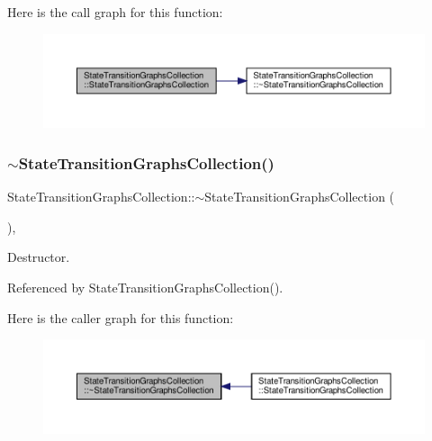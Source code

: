 Here is the call graph for this function\+:
\nopagebreak
\begin{figure}[H]
\begin{center}
\leavevmode
\includegraphics[width=350pt]{d3/d2c/classStateTransitionGraphsCollection_a1103b1504905684e153f0a746f8d85be_cgraph}
\end{center}
\end{figure}
\mbox{\label{classStateTransitionGraphsCollection_afabde2a96d4934b3f6d251b65855645e}} 
\subsubsection{\texorpdfstring{$\sim$\+State\+Transition\+Graphs\+Collection()}{~StateTransitionGraphsCollection()}}
{\footnotesize\ttfamily State\+Transition\+Graphs\+Collection\+::$\sim$\+State\+Transition\+Graphs\+Collection (\begin{DoxyParamCaption}{ }\end{DoxyParamCaption})\hspace{0.3cm}{\ttfamily [override]}, {\ttfamily [default]}}



Destructor. 



Referenced by State\+Transition\+Graphs\+Collection().

Here is the caller graph for this function\+:
\nopagebreak
\begin{figure}[H]
\begin{center}
\leavevmode
\includegraphics[width=350pt]{d3/d2c/classStateTransitionGraphsCollection_afabde2a96d4934b3f6d251b65855645e_icgraph}
\end{center}
\end{figure}


